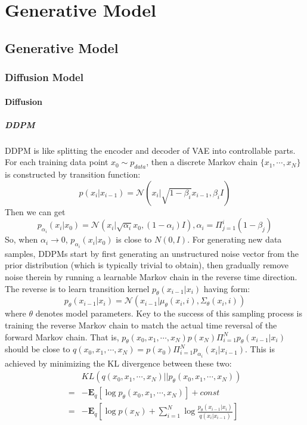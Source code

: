 \chapter{Generative Model}\label{cap2}

\section{Generative Model}

\subsection{Diffusion Model}
\subsubsection{Diffusion}
\paragraph{DDPM}
DDPM is like splitting the encoder and decoder of VAE into controllable parts. 
For each training data point $x_0\sim p_{data}$, then a discrete Markov chain $\{x_1, \cdots, x_N\}$ is constructed by transition function:
\begin{equation}
    p(x_i|x_{i-1})=\mathcal{N}(x_i|\sqrt{1-\beta_i}x_{i-1}, \beta_i I)
\end{equation}
Then we can get 
\begin{equation}
    p_{\alpha_i}(x_i|x_0) = \mathcal{N}(x_i|\sqrt{\alpha_i}x_0, (1-\alpha_i)I), \alpha_i = \Pi_{j=1}^i(1-\beta_j)
\end{equation}
So, when $\alpha_i\to 0$, $p_{\alpha_i}(x_i|x_0)$ is close to $N(0, I)$. For generating  new data samples, DDPMs start by first generating an unstructured noise vector from the prior distribution (which is  typically trivial to obtain), then gradually remove noise therein by running a learnable Markov chain in the reverse  time direction.
The reverse is to learn transition kernel $p_\theta(x_{i-1}|x_i)$ having form:
\begin{equation}
    p_\theta(x_{i-1}|x_i) = \mathcal{N}(x_{i-1}|\mu_\theta(x_i, i), \Sigma_\theta(x_i, i))
\end{equation}
where $\theta$ denotes model parameters. Key to the success of this sampling process is training the reverse Markov chain to match the actual time reversal  of the forward Markov chain.
That is, $p_\theta(x_0, x_1, \cdots, x_N)p(x_N)\Pi_{i=1}^Np_\theta(x_{i-1}|x_i)$ should be close to $q(x_0, x_1, \cdots, x_N)=p(x_0)\Pi_{i=1}^Np_{\alpha_i}(x_i|x_{i-1})$.
This is achieved by minimizing the KL divergence between these two:
\begin{equation}
    \begin{aligned}
        &KL(q(x_0, x_1, \cdots, x_N)||p_\theta(x_0, x_1, \cdots, x_N))\\
        =&-\mathbf{E}_{q}\left[\log p_\theta(x_0, x_1, \cdots, x_N)\right] + const\\
        =&-\mathbf{E}_{q}\left[\log p(x_N) + \sum_{i=1}^N \log \frac{p_\theta(x_{i-1}|x_i)}{q(x_i|x_{i-1})}\right]
    \end{aligned}
\end{equation}

